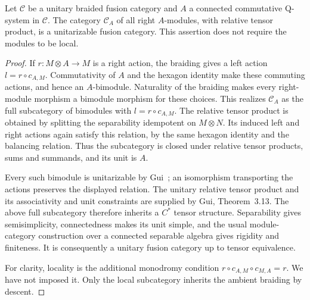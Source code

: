 \begin{lemma}
\label{lem:analytic-unitary-all-modules}
Let $\mathcal C$ be a unitary braided fusion category and $A$ a
connected commutative Q-system in $\mathcal C$.  The category
$\mathcal C_A$ of all right $A$-modules, with relative tensor product,
is a unitarizable fusion category.  This assertion does not require
the modules to be local.
\end{lemma}
\begin{proof}
If $r:M\otimes A\to M$ is a right action, the braiding gives a left
action $l=r\circ c_{A,M}$.  Commutativity of $A$ and the hexagon
identity make these commuting actions, and hence an $A$-bimodule.
Naturality of the braiding makes every right-module morphism a
bimodule morphism for these choices.  This realizes $\mathcal C_A$
as the full subcategory of bimodules with $l=r\circ c_{A,M}$.
The relative tensor product is obtained by splitting the separability
idempotent on $M\otimes N$.  Its induced left and right actions again
satisfy this relation, by the same hexagon identity and the balancing
relation.  Thus the subcategory is closed under relative tensor
products, sums and summands, and its unit is $A$.

Every such bimodule is unitarizable by
Gui~\cite[Theorem~2.28]{Gui}; an isomorphism transporting the actions preserves
the displayed relation.  The unitary relative tensor product and its
associativity and unit constraints are supplied by Gui, Theorem~3.13.
The above full subcategory therefore inherits a $C^*$ tensor structure.
Separability gives semisimplicity, connectedness makes its unit simple,
and the usual module-category construction over a connected separable
algebra gives rigidity and finiteness.  It is consequently a unitary
fusion category up to tensor equivalence.

For clarity, locality is the additional monodromy condition
$r\circ c_{A,M}\circ c_{M,A}=r$.  We have not imposed it.  Only the
local subcategory inherits the ambient braiding by descent.
\end{proof}

